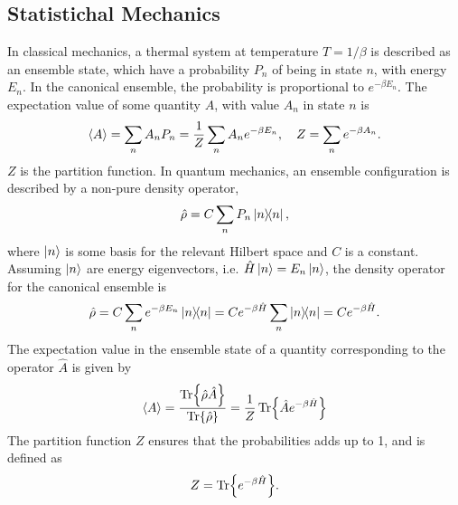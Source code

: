 \subsection{Statistichal Mechanics}
In classical mechanics, a thermal system at temperature $T = 1 / \beta$ is described as an ensemble state, which have a probability $P_n$ of being in state $n$, with energy $E_n$.
In the canonical ensemble, the probability is proportional to $e^{-\beta E_n}$.
The expectation value of some quantity $A$, with value $A_n$ in state $n$ is
\begin{equation*}
    \ex{A} 
    = \sum_n A_n P_n = \frac{1}{Z} \sum_n A_n e^{- \beta E_n}, \quad 
    Z  = \sum_n e^{-\beta A_n}.
\end{equation*}
$Z$ is the partition function. In quantum mechanics, an ensemble configuration is described by a non-pure density operator,
\begin{equation*}
    \hat \rho = C \sum_n P_n \ketbra{n}{n},
\end{equation*}
where $\ket{n}$ is some basis for the relevant Hilbert space and $C$ is a constant. Assuming $\ket{n}$ are energy eigenvectors, i.e. $\hat H \ket{n} = E_n \ket{n}$, the density operator for the canonical ensemble is
\begin{equation*}
    \hat \rho 
    = C \sum_n e^{-\beta E_n} \ketbra{n}{n} 
    = C e^{-\beta \hat H} \sum_n \ketbra{n}{n} 
    = C e^{-\beta \hat H}.
\end{equation*}
The expectation value in the ensemble state of a quantity corresponding to the operator $\hat A$ is given by
\begin{align}
    \ex{A} = \frac{ \Tr{\hat \rho \hat A} }{\Tr{\hat \rho }}
    = \frac{1}{Z} \Tr{\hat A e^{-\beta \hat H}}
\end{align}
The partition function $Z$ ensures that the probabilities adds up to 1, and is defined as
\begin{equation}
    Z = \Tr{e^{-\beta \hat H}}.
\end{equation}


